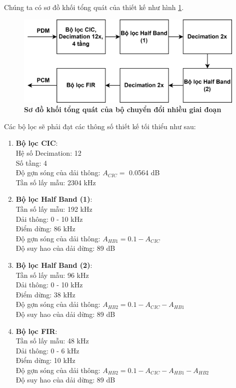 Chúng ta có sơ đồ khối tổng quát của thiết kế như hình \ref{pipeline_new}.
\begin{figure}[H]
    \centering
    \includegraphics[width=11cm]{Images/Chuong3/pipeline_new_top.png}
    \caption[Sơ đồ khối tổng quát của bộ chuyển đổi nhiều giai đoạn]{\bfseries \fontsize{12pt}{0pt}\selectfont Sơ đồ khối tổng quát của bộ chuyển đổi nhiều giai đoạn}
    \label{pipeline_new}
\end{figure}
 \noindent Các bộ lọc sẽ phải đạt các thông số thiết kế tối thiểu như sau:
\begin{enumerate}
    \item \textbf{Bộ lọc CIC}: \\
    Hệ số Decimation: 12\\
    Số tầng: 4\\
    Độ gợn sóng của dải thông: $A_{CIC} =$ 0.0564 dB\\
    Tần số lấy mẫu: 2304 kHz
    \item \textbf{Bộ lọc Half Band (1)}:\\
    Tần số lấy mẫu: 192 kHz\\
    Dải thông: 0 - 10 kHz\\
    Điểm dừng: 86 kHz\\
    Độ gợn sóng của dải thông: $A_{HB1} = 0.1 - A_{CIC}$\\
    Độ suy hao của dải dừng: 89 dB
    \item \textbf{Bộ lọc Half Band (2)}:\\
    Tần số lấy mẫu: 96 kHz\\
    Dải thông: 0 - 10 kHz\\
    Điểm dừng: 38 kHz\\
    Độ gợn sóng của dải thông: $A_{HB2} = 0.1 - A_{CIC} - A_{HB1}$\\
    Độ suy hao của dải dừng: 89 dB
    \item \textbf{Bộ lọc FIR}:\\
    Tần số lấy mẫu: 48 kHz\\
    Dải thông: 0 - 6 kHz\\
    Điểm dừng: 10 kHz\\
    Độ gợn sóng của dải thông: $A_{HB2} = 0.1 - A_{CIC} - A_{HB1} - A_{HB2}$\\
    Độ suy hao của dải dừng: 89 dB
\end{enumerate}

